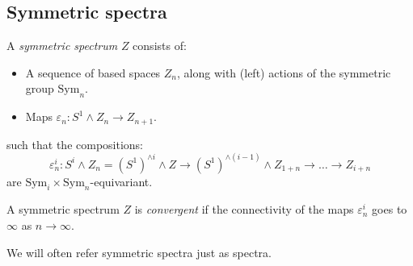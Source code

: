 \documentclass{TPmod}
\newcommand{\Sym}{\mathrm{Sym}}
\newcommand{\eps}{\varepsilon}
\numberwithin{equation}{section}
\begin{document}
\subsection{Symmetric spectra}\label{sec: spec}
    \begin{defn}
        A \emph{symmetric spectrum} $Z$ consists of:
        \begin{itemize}
            \item A sequence of based spaces $Z_n$, along with (left) actions of the symmetric group $\Sym_n$.
            \item Maps $\eps_n: S^1 \wedge Z_n \to Z_{n+1}$.
        \end{itemize}
        such that the compositions:
        \begin{equation}
            \eps^i_n: S^i \wedge Z_n = (S^1)^{\wedge i} \wedge Z \to (S^1)^{\wedge (i-1)} \wedge Z_{1+n} \to \ldots \to Z_{i+n}
        \end{equation}
        are $\Sym_i \times \Sym_n$-equivariant.
        
        A symmetric spectrum $Z$ is \emph{convergent} if the connectivity of the maps $\eps^i_n$ goes to $\infty$ as $n \to \infty$. 
    \end{defn}
    We will often refer symmetric spectra just as spectra.
\end{document}
